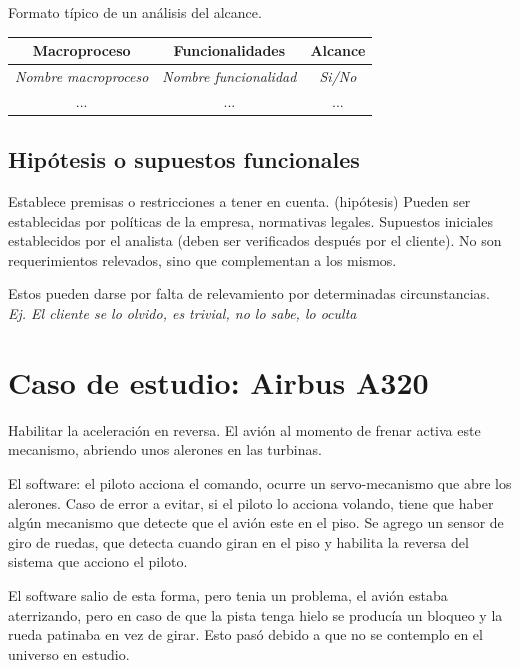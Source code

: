 \documentclass[titlepage,a4paper]{article}
\begin{document}
Formato típico de un análisis del alcance.



\begin{table}[]
\begin{center}
\begin{tabular}{|l|l|c|}
\hline
\multicolumn{1}{|c|}{Macroproceso} & \multicolumn{1}{c|}{Funcionalidades} & Alcance \\ \hline
\textit{Nombre macroproceso}      & \textit{Nombre funcionalidad}       & \textit{Si/No} \\ \hline
 \multicolumn{1}{|c|}{...}          & \multicolumn{1}{c|}{...}            & ...            \\ \hline
\end{tabular}
\end{center}
\end{table}


\subsection{Hipótesis o supuestos funcionales}
Establece premisas o restricciones a tener en cuenta. (hipótesis)
Pueden ser establecidas por políticas de la empresa, normativas legales. Supuestos iniciales establecidos por el analista (deben ser verificados después por el cliente). No son requerimientos relevados, sino que complementan a los mismos.

Estos pueden darse por falta de relevamiento por determinadas circunstancias. \textit{Ej. El cliente se lo olvido, es trivial, no lo sabe, lo oculta}

\section{Caso de estudio: Airbus A320}

Habilitar la aceleración en reversa. El avión al momento de frenar activa este mecanismo, abriendo unos alerones en las turbinas.

El software: el piloto acciona el comando, ocurre un servo-mecanismo que abre los alerones. Caso de error a evitar, si el piloto lo acciona volando, tiene que haber algún mecanismo que detecte que el avión este en el piso. Se agrego un sensor de giro de ruedas, que detecta cuando giran en el piso y habilita la reversa del sistema que acciono el piloto.

El software salio de esta forma, pero tenia un problema, el avión estaba aterrizando, pero en caso de que la pista tenga hielo se producía un bloqueo y la rueda patinaba en vez de girar. Esto pasó debido a que no se contemplo en el universo en estudio.
\end{document}
